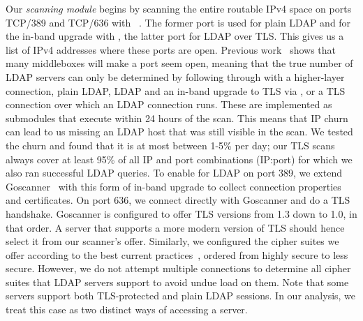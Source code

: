 

Our \emph{scanning module} begins by scanning the entire routable IPv4 space on ports TCP/389 and TCP/636 with \zmap ~\cite{durumeric2013zmap}. The former port is used for plain \acrshort{LDAP} and for the in-band upgrade with \starttls, the latter port for \acrshort{LDAP} over TLS. This gives us a list of IPv4 addresses where these ports are open. Previous work~\cite{Izhikevich2022,Sattler2023} shows that many middleboxes will make a port seem open, meaning that the true number of \acrshort{LDAP} servers can only be determined by following through with a higher-layer connection, \ie plain \acrshort{LDAP}, \acrshort{LDAP} and an in-band upgrade to \acrshort{TLS} via \starttls, or a \acrshort{TLS} connection over which an \acrshort{LDAP} connection runs. These are implemented as submodules that execute within 24 hours of the scan. This means that IP churn can lead to us missing an \acrshort{LDAP} host that was still visible in the \zmap scan. We tested the churn and found that it is at most between 1-5\% per day; \eg our \acrshort{TLS} scans always cover at least 95\% of all IP and port combinations (IP:port) for which we also ran successful \acrshort{LDAP} queries. To enable \starttls for \acrshort{LDAP} on port 389, we extend Goscanner~\cite{Goscanner2017} with this form of in-band upgrade to collect connection properties and certificates. On port 636, we connect directly with Goscanner and do a TLS handshake. Goscanner is configured to offer \acrshort{TLS} versions from 1.3 down to 1.0, in that order. A server that supports a more modern version of \acrshort{TLS} should hence select it from our scanner's offer. Similarly, we configured the cipher suites we offer according to the best current practices~\cite{rfc9325}, 
ordered from highly secure to less secure.  However, we do not attempt multiple connections to determine all cipher suites that \acrshort{LDAP} servers support to avoid undue load on them. Note that some servers support both \acrshort{TLS}-protected and plain \acrshort{LDAP} sessions. In our analysis, we treat this case as two distinct ways of accessing a server.

